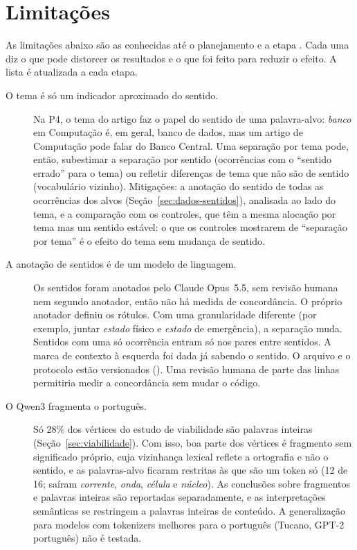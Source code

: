 \section{Limitações}\label{sec:limitacoes}

As limitações abaixo são as conhecidas até o planejamento e a etapa . Cada uma diz
o que pode distorcer os resultados e o que foi feito para reduzir o efeito. A lista é
atualizada a cada etapa.

\begin{description}
    \item[O tema é só um indicador aproximado do sentido.] Na P4, o tema do artigo faz o papel
    do sentido de uma palavra-alvo: \emph{banco} em Computação é, em geral, banco de dados, mas
    um artigo de Computação pode falar do Banco Central. Uma separação por tema pode, então,
    subestimar a separação por sentido (ocorrências com o ``sentido errado'' para o tema) ou
    refletir diferenças de tema que não são de sentido (vocabulário vizinho). Mitigações: a
    anotação do sentido de todas as ocorrências dos alvos (Seção~\ref{sec:dados-sentidos}), analisada
    ao lado do tema, e a comparação com os controles, que têm a mesma alocação por tema mas um
    sentido estável: o que os controles mostrarem de ``separação por tema'' é o efeito do tema
    sem mudança de sentido.

    \item[A anotação de sentidos é de um modelo de linguagem.] Os sentidos foram anotados pelo
    Claude Opus~5.5, sem revisão humana nem segundo anotador, então não há medida de
    concordância. O próprio anotador definiu os rótulos. Com uma granularidade diferente (por
    exemplo, juntar \emph{estado} físico e \emph{estado} de emergência), a separação muda.
    Sentidos com uma só ocorrência entram só nos pares entre sentidos. A marca de contexto à
    esquerda foi dada já sabendo o sentido. O arquivo e o protocolo estão versionados
    (). Uma revisão humana de parte das linhas permitiria medir a
    concordância sem mudar o código.

    \item[O Qwen3 fragmenta o português.] Só 28\% dos vértices do estudo de viabilidade são
    palavras inteiras (Seção~\ref{sec:viabilidade}). Com isso, boa parte dos vértices é
    fragmento sem significado próprio, cuja vizinhança lexical reflete a ortografia e não o
    sentido, e as palavras-alvo ficaram restritas às que são um token só (12 de 16; saíram
    \emph{corrente}, \emph{onda}, \emph{célula} e \emph{núcleo}). As conclusões sobre
    fragmentos e palavras inteiras são reportadas separadamente, e as interpretações
    semânticas se restringem a palavras inteiras de conteúdo. A generalização para modelos com
    tokenizers melhores para o português (Tucano, GPT-2 português) não é testada.


\end{description}
